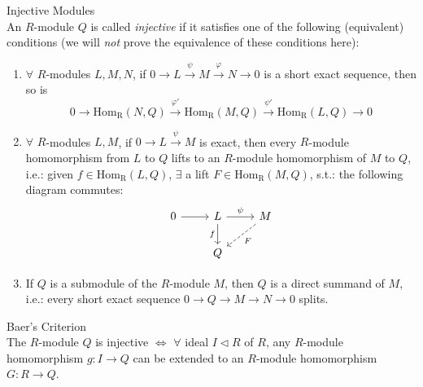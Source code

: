 \begin{definition}{Injective Modules}\\
An $R$-module $Q$ is called \textit{injective} if it satisfies one of the following (equivalent) conditions (we will \textit{not} prove the equivalence of these conditions here):
\begin{enumerate}
    \item $\forall$ $R$-modules $L,M,N$, if $0 \to L \overset{\psi}{\to} M \overset{\varphi}{\to} N \to 0$ is a short exact sequence, then so is
    $$0 \to \text{Hom}_\text{R} (N,Q) \overset{\varphi'}{\to} \text{Hom}_\text{R}(M,Q) \overset{\psi'}{\to} \text{Hom}_\text{R} (L,Q) \to 0$$

    \item $\forall$ $R$-modules $L,M$, if $0 \to L \overset{\psi}{\to} M$ is exact, then every $R$-module homomorphism from $L$ to $Q$ lifts to an $R$-module homomorphism of $M$ to $Q$, i.e.: given $f \in \text{Hom}_\text{R} (L,Q)$, $\exists$ a lift $F\in \text{Hom}_\text{R} (M,Q)$, s.t.: the following diagram commutes:
    \[
    \begin{tikzcd}
        0 \arrow[r] & L \arrow[r, "\psi"] \arrow[d, "f"'] &M \arrow[dl, dashed, "F"] \\
        & Q
    \end{tikzcd}
    \]

    \item If $Q$ is a submodule of the $R$-module $M$, then $Q$ is a direct summand of $M$, i.e.: every short exact sequence $0 \to Q\to M\to N \to0$ splits.
\end{enumerate}
\end{definition}

\begin{theorem}{Baer's Criterion}\\
The $R$-module $Q$ is injective $\Leftrightarrow$ $\forall$ ideal $I \triangleleft R$ of $R$, any $R$-module homomorphism $g :I \to Q$ can be extended to an $R$-module homomorphism $G: R \to Q$.
\end{theorem}

